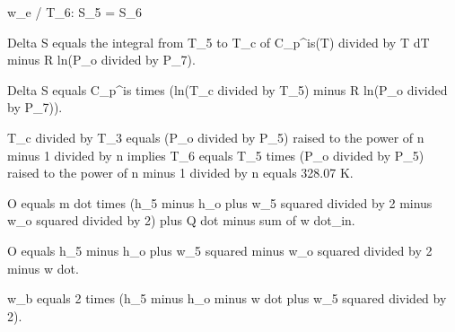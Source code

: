 w_e / T_6:
S_5 = S_6

Delta S equals the integral from T_5 to T_c of C_p^is(T) divided by T dT minus R ln(P_o divided by P_7).

Delta S equals C_p^is times (ln(T_c divided by T_5) minus R ln(P_o divided by P_7)).

T_c divided by T_3 equals (P_o divided by P_5) raised to the power of n minus 1 divided by n implies T_6 equals T_5 times (P_o divided by P_5) raised to the power of n minus 1 divided by n equals 328.07 K.

O equals m dot times (h_5 minus h_o plus w_5 squared divided by 2 minus w_o squared divided by 2) plus Q dot minus sum of w dot_in.

O equals h_5 minus h_o plus w_5 squared minus w_o squared divided by 2 minus w dot.

w_b equals 2 times (h_5 minus h_o minus w dot plus w_5 squared divided by 2).